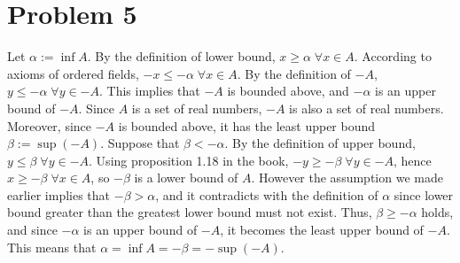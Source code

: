\documentclass{scrartcl}
\begin{document}
\section{Problem 5}
Let \(\alpha := \inf A\). By the definition of lower bound, \(x \geq \alpha \; \forall x \in A\). According to axioms of ordered fields, \(-x \leq -\alpha \; \forall x \in A\). By the definition of \(-A\), \(y \leq -\alpha \; \forall y \in -A\). This implies that \(-A\) is bounded above, and \(-\alpha\) is an upper bound of \(-A\). Since \(A\) is a set of real numbers, \(-A\) is also a set of real numbers. Moreover, since \(-A\) is bounded above, it has the least upper bound \(\beta := \sup (-A)\). Suppose that \(\beta < -\alpha\). By the definition of upper bound, \(y \leq \beta \; \forall y \in -A\). Using proposition 1.18 in the book, \(-y \geq -\beta \; \forall y \in -A\), hence \(x \geq -\beta \; \forall x \in A\), so \(-\beta\) is a lower bound of \(A\). However the assumption we made earlier implies that \(-\beta > \alpha\), and it contradicts with the definition of \(\alpha\) since lower bound greater than the greatest lower bound must not exist. Thus, \(\beta \geq -\alpha\) holds, and since \(-\alpha\) is an upper bound of \(-A\), it becomes the least upper bound of \(-A\). This means that \(\alpha = \inf A = -\beta = -\sup(-A)\).
\end{document}

